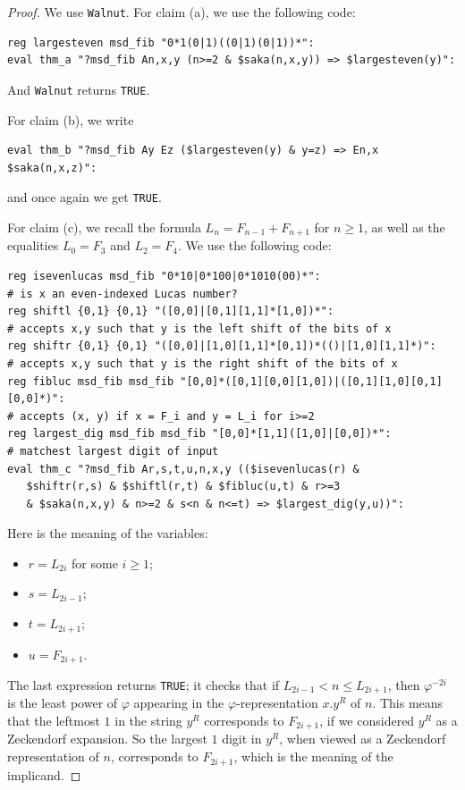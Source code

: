 \documentclass[12pt,reqno]{article}
\begin{document}
\begin{proof}
    We use {\tt Walnut}.  For claim (a), we use the following code:
\begin{verbatim}
reg largesteven msd_fib "0*1(0|1)((0|1)(0|1))*":
eval thm_a "?msd_fib An,x,y (n>=2 & $saka(n,x,y)) => $largesteven(y)":
\end{verbatim}
And {\tt Walnut} returns {\tt TRUE}.

For claim (b), we write
\begin{verbatim}
eval thm_b "?msd_fib Ay Ez ($largesteven(y) & y=z) => En,x $saka(n,x,z)":
\end{verbatim}
and once again we get {\tt TRUE}.

For claim (c), we recall the formula $L_n = F_{n-1} + F_{n+1}$ for $n\geq 1$, as well as the equalities $L_0 = F_3$ and $L_2 = F_4$. We use the
following code:
\begin{verbatim}
reg isevenlucas msd_fib "0*10|0*100|0*1010(00)*":
# is x an even-indexed Lucas number?
reg shiftl {0,1} {0,1} "([0,0]|[0,1][1,1]*[1,0])*":
# accepts x,y such that y is the left shift of the bits of x
reg shiftr {0,1} {0,1} "([0,0]|[1,0][1,1]*[0,1])*(()|[1,0][1,1]*)":
# accepts x,y such that y is the right shift of the bits of x
reg fibluc msd_fib msd_fib "[0,0]*([0,1][0,0][1,0])|([0,1][1,0][0,1][0,0]*)":
# accepts (x, y) if x = F_i and y = L_i for i>=2
reg largest_dig msd_fib msd_fib "[0,0]*[1,1]([1,0]|[0,0])*":
# matchest largest digit of input
eval thm_c "?msd_fib Ar,s,t,u,n,x,y (($isevenlucas(r) & 
   $shiftr(r,s) & $shiftl(r,t) & $fibluc(u,t) & r>=3 
   & $saka(n,x,y) & n>=2 & s<n & n<=t) => $largest_dig(y,u))":
\end{verbatim}
Here is the meaning of the variables:
\begin{itemize}
    \item $r = L_{2i}$ for some $i \geq 1$;
    \item $s = L_{2i-1}$;
    \item $t = L_{2i+1}$;
    \item $u = F_{2i+1}$.
\end{itemize}
The last expression returns {\tt TRUE}; it checks that if $L_{2i-1} < n \leq L_{2i+1}$, then
$\varphi^{-2i}$ is the least power of $\varphi$ appearing in the
$\varphi$-representation $x.y^R$ of $n$.  This means that the leftmost
$1$ in the string $y^R$ corresponds to $F_{2i+1}$, if we considered
$y^R$ as a Zeckendorf expansion.  So the largest $1$ digit in $y^R$, when viewed as a Zeckendorf representation of $n$, corresponds to $F_{2i+1}$, which is the meaning of the implicand.
\end{proof}
\end{document}
